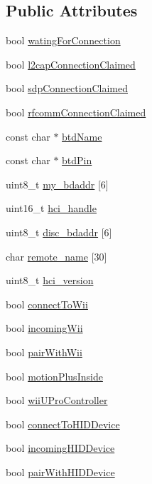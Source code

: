 \subsection*{\-Public \-Attributes}
\begin{DoxyCompactItemize}
\item 
bool \hyperlink{class_b_t_d_aa7735da01865bab01b569ee836173737}{wating\-For\-Connection}
\item 
bool \hyperlink{class_b_t_d_a0f1c28a03bcbe62cc7c083f97ea27594}{l2cap\-Connection\-Claimed}
\item 
bool \hyperlink{class_b_t_d_af5e5b085cec1da5c83c75e80e95b3590}{sdp\-Connection\-Claimed}
\item 
bool \hyperlink{class_b_t_d_a9e5a34242007b64cd6a226cfd1901e74}{rfcomm\-Connection\-Claimed}
\item 
const char $\ast$ \hyperlink{class_b_t_d_a0359c0c158c864c27319810cbd1534f9}{btd\-Name}
\item 
const char $\ast$ \hyperlink{class_b_t_d_a215cb939c01ed3ff56db37841224546c}{btd\-Pin}
\item 
uint8\-\_\-t \hyperlink{class_b_t_d_a1f8e9171a310e50f2c4a3c19066efe5a}{my\-\_\-bdaddr} \mbox{[}6\mbox{]}
\item 
uint16\-\_\-t \hyperlink{class_b_t_d_aa3bb6c692701cb33dfad1ea4d68b6f98}{hci\-\_\-handle}
\item 
uint8\-\_\-t \hyperlink{class_b_t_d_ab23f95f12675d7b4505ca6807d379182}{disc\-\_\-bdaddr} \mbox{[}6\mbox{]}
\item 
char \hyperlink{class_b_t_d_aa0fd5483f227e29de23c20ee31c940aa}{remote\-\_\-name} \mbox{[}30\mbox{]}
\item 
uint8\-\_\-t \hyperlink{class_b_t_d_addaddee110af23a3195ad56f631e69ea}{hci\-\_\-version}
\item 
bool \hyperlink{class_b_t_d_ac7caac80fb6f5f0e794af3644887d88e}{connect\-To\-Wii}
\item 
bool \hyperlink{class_b_t_d_a4dc8f94fe85028f3d54f13dde1e5b4ee}{incoming\-Wii}
\item 
bool \hyperlink{class_b_t_d_a0c8cc2a2dd2cda3e760b8b4c1a2d169c}{pair\-With\-Wii}
\item 
bool \hyperlink{class_b_t_d_a3aea445b2349e99ef057db1a4ffdd9dc}{motion\-Plus\-Inside}
\item 
bool \hyperlink{class_b_t_d_a962a5714c225dcb633434f02e3657583}{wii\-U\-Pro\-Controller}
\item 
bool \hyperlink{class_b_t_d_af40b8d52df99192880c8a13443b6c6d8}{connect\-To\-H\-I\-D\-Device}
\item 
bool \hyperlink{class_b_t_d_a685d6371fb0c950ff6bad4510a8cc85a}{incoming\-H\-I\-D\-Device}
\item 
bool \hyperlink{class_b_t_d_a2aa418d820fb6b877ea079e0436a518e}{pair\-With\-H\-I\-D\-Device}
\end{DoxyCompactItemize}
